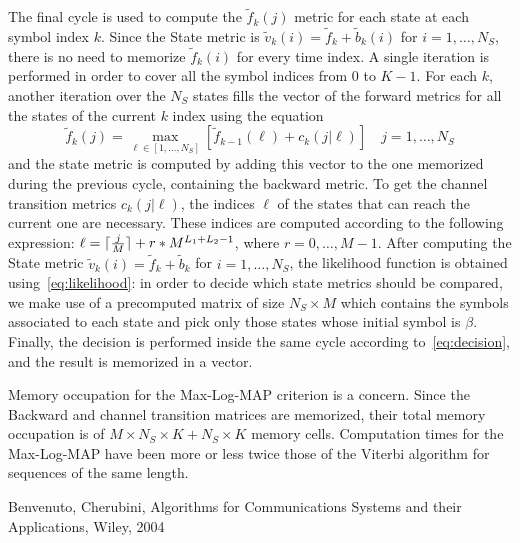 \documentclass[10pt]{article}
\DeclarePairedDelimiter{\ceil}{\lceil}{\rceil}
\begin{document}
The final cycle is used to compute the $\tilde{f}_k(j)$ metric for each state at each symbol index $k$. Since the State metric is $\tilde{v}_k(i) = \tilde{f}_k + \tilde{b}_k(i)$ for $i = 1, \dots, N_S$, there is no need to memorize $\tilde{f}_k(i)$ for every time index. A single iteration is performed in order to cover all the symbol indices from $0$ to $K-1$. For each $k$, another iteration over the $N_S$ states fills the vector of the forward metrics for all the states of the current $k$ index using the equation
\begin{equation}
	\tilde{f}_k(j) = \max_{\ell \in [1, \dots, N_S]} [\tilde{f}_{k-1}(\ell) + c_k(j|\ell)] \quad j = 1, \dots, N_S
\end{equation}
and the state metric is computed by adding this vector to the one memorized during the previous cycle, containing the backward metric. To get the channel transition metrics $c_k(j|\ell)$, the indices $\ell$ of the states that can reach the current one are necessary. These indices are computed according to the following expression: $\ell = \ceil{\frac{j}{M}} + r*M^{L_1+L_2-1}$, where $r = 0, \dots, M-1$. 
After computing the State metric $\tilde{v}_k(i) = \tilde{f}_k + \tilde{b}_k$ for $i = 1, \dots, N_S$, the likelihood function is obtained using~\eqref{eq:likelihood}: in order to decide which state metrics should be compared, we make use of a precomputed matrix of size $N_S \times M$ which contains the symbols associated to each state and pick only those states whose initial symbol is $\beta$. Finally, the decision is performed inside the same cycle according to~\eqref{eq:decision}, and the result is memorized in a vector.

Memory occupation for the Max-Log-MAP criterion is a concern. Since the Backward and channel transition matrices are memorized, their total memory occupation is of $M \times N_S \times K + N_S \times K$ memory cells. Computation times for the Max-Log-MAP have been more or less twice those of the Viterbi algorithm for sequences of the same length.




\begin{thebibliography}{10}

Benvenuto, Cherubini, Algorithms for Communications Systems and their Applications, Wiley, 2004

\end{thebibliography}
\end{document}
